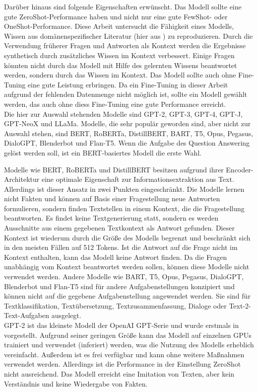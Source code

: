 Darüber hinaus sind folgende Eigenschaften erwünscht.
Das Modell sollte eine gute ZeroShot-Performance haben und nicht nur eine gute FewShot- oder OneShot-Performance.
Diese Arbeit untersucht die Fähigkeit eines Modells, Wissen aus domänenspezifischer Literatur (hier aus \citet{bb}) zu reproduzieren.
Durch die Verwendung früherer Fragen und Antworten als Kontext werden die Ergebnisse synthetisch durch zusätzliches Wissen im Kontext verbessert.
Einige Fragen könnten nicht durch das Modell mit Hilfe des gelernten Wissens beantwortet werden, sondern durch das Wissen im Kontext.
Das Modell sollte auch ohne Fine-Tuning eine gute Leistung erbringen.
Da ein Fine-Tuning in dieser Arbeit aufgrund der fehlenden Datenmenge nicht möglich ist, sollte ein Modell gewählt werden, das auch ohne diess Fine-Tuning eine gute Performance erreicht.\\

Die hier zur Auswahl stehenden Modelle sind GPT-2, GPT-3, GPT-4, GPT-J, GPT-NeoX und LLaMa.
Modelle, die sehr populär geworden sind, aber nicht zur Auswahl stehen, sind BERT, RoBERTa, DistillBERT, BART, T5, Opus, Pegasus, DialoGPT, Blenderbot und Flan-T5.
Wenn die Aufgabe des Question Answering gelöst werden soll, ist ein BERT-basiertes Modell die erste Wahl.

Modelle wie BERT, RoBERTa und DistillBERT besitzen aufgrund ihrer Encoder-Architektur eine optimale Eigenschaft zur Informationsextraktion aus Text.
Allerdings ist dieser Ansatz in zwei Punkten eingeschränkt.
Die Modelle lernen nicht Fakten und können auf Basis einer Fragestellung neue Antworten formulieren, sondern finden Textstellen in einem Kontext, die die Fragestellung beantworten.
Es findet keine Textgenerierung statt, sondern es werden Ausschnitte aus einem gegebenen Textkontext als Antwort gefunden.
Dieser Kontext ist wiederum durch die Größe des Modells begrenzt und beschränkt sich in den meisten Fällen auf 512 Tokens.
Ist die Antwort auf die Frage nicht im Kontext enthalten, kann das Modell keine Antwort finden.
Da die Fragen unabhängig vom Kontext beantwortet werden sollen, können diese Modelle nicht verwendet werden.
Andere Modelle wie BART, T5, Opus, Pegasus, DialoGPT, Blenderbot und Flan-T5 sind für andere Aufgabenstellungen konzipiert und können nicht auf die gegebene Aufgabenstellung angewendet werden.
Sie sind für Textklassifikation, Textübersetzung, Textzusammenfassung, Dialoge oder Text-2-Text-Aufgaben ausgelegt.\\

GPT-2 ist das kleinste Modell der OpenAI GPT-Serie und wurde erstmals in \citet{gpt2} vorgestellt.
Aufgrund seiner geringen Größe kann das Modell auf einzelnen GPUs trainiert und verwendet (inferiert) werden, was die Nutzung des Modells erheblich vereinfacht.
Außerdem ist es frei verfügbar und kann ohne weitere Maßnahmen verwendet werden.
Allerdings ist die Performance in der Einstellung ZeroShot nicht ausreichend.
Das Modell erreicht eine Imitation von Texten, aber kein Verständnis und keine Wiedergabe von Fakten.\\

